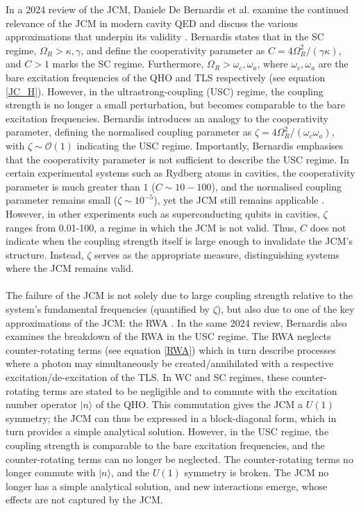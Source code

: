 \documentclass[12pt,a4paper]{article}
\begin{document}
In a 2024 review of the JCM, Daniele De Bernardis et al. examine the continued relevance of the JCM in modern cavity QED and discuss the various approximations that underpin its validity \cite{General2024-JCM_relevance}. Bernardis states that in the SC regime, $\Omega_R > \kappa, \gamma$, and define the cooperativity parameter as $C = 4\Omega^{2}_R/(\gamma\kappa)$, and $C > 1$ marks the SC regime. Furthermore, $\Omega_R > \omega_c, \omega_a$, where $\omega_c, \omega_a$ are the bare excitation frequencies of the QHO and TLS respectively (see equation \eqref{JC_H}). However, in the ultrastrong-coupling (USC) regime, the coupling strength is no longer a small perturbation, but becomes comparable to the bare excitation frequencies. Bernardis introduces an analogy to the cooperativity parameter, defining  the normalised coupling parameter as $\zeta = 4\Omega^{2}_R/(\omega_c\omega_a)$, with $\zeta \sim \mathcal{O}(1) $ indicating the USC regime. Importantly, Bernardis emphasises that the cooperativity parameter is not sufficient to describe the USC regime. In certain experimental systems such as Rydberg atoms in cavities, the cooperativity parameter is much greater than $1$ ($C \sim 10-100$), and the normalised coupling parameter remains small ($\zeta \sim 10^{-5} $), yet the JCM still remains applicable . However, in other experiments such as superconducting qubits in cavities, $\zeta$ ranges from 0.01-100, a regime in which the JCM is not valid. Thus, $C$ does not indicate when the coupling strength itself is large enough to invalidate the JCM’s structure. Instead, $\zeta$ serves as the appropriate measure, distinguishing systems where the JCM remains valid.\\
\\
The failure of the JCM is not solely due to large coupling strength relative to the system’s fundamental frequencies (quantified by $\zeta$), but also due to one of the key approximations of the JCM: the RWA \cite{General2024-JCM_relevance}. In the same 2024 review, Bernardis also examines the breakdown of the RWA in the USC regime. The RWA neglects counter-rotating terms (see equation \eqref{RWA}) which in turn describe processes where a photon may simultaneously be created/annihilated with a respective excitation/de-excitation of the TLS. In WC and SC regimes, these counter-rotating terms are stated to be negligible and to commute with the excitation number operator $|n\rangle$ of the QHO. This commutation gives the JCM a $U(1)$ symmetry; the JCM can thus be expressed in a block-diagonal form, which in turn provides a simple analytical solution. However, in the USC regime, the coupling strength is comparable to the bare excitation frequencies, and the counter-rotating terms can no longer be neglected. The counter-rotating terms no longer commute with  $|n\rangle$, and the $U(1)$ symmetry is broken. The JCM no longer has a simple analytical solution, and new interactions emerge, whose effects are not captured by the JCM. 
\end{document}
